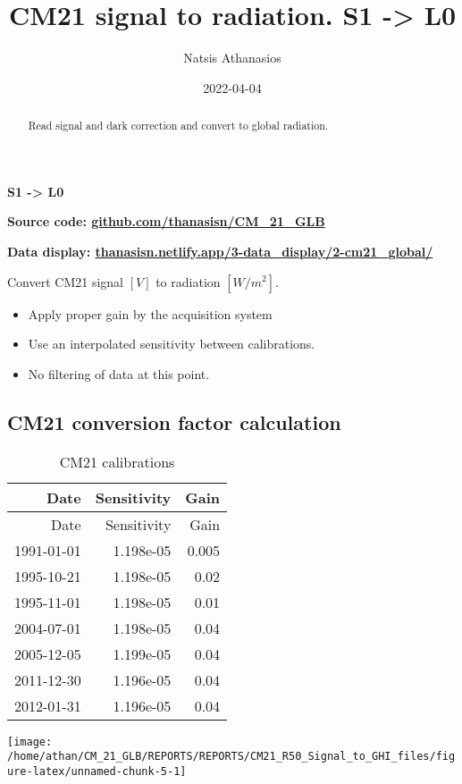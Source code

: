 \documentclass[
  11pt,
  a4paper,oneside]{article}
\title{CM21 signal to radiation. \textbf{S1 -\textgreater{} L0}}
\author{Natsis Athanasios}
\date{2022-04-04}
\providecommand{\tightlist}{%
  \setlength{\itemsep}{0pt}\setlength{\parskip}{0pt}}
\begin{document}
\maketitle
\begin{abstract}
Read signal and dark correction and convert to global radiation.
\end{abstract}

{
\hypersetup{linkcolor=}
\setcounter{tocdepth}{2}
\tableofcontents
}
\textbf{S1 -\textgreater{} L0}

\textbf{Source code: \href{https://github.com/thanasisn/CM_21_GLB}{github.com/thanasisn/CM\_21\_GLB}}

\textbf{Data display: \href{https://thanasisn.netlify.app/3-data_display/2-cm21_global/}{thanasisn.netlify.app/3-data\_display/2-cm21\_global/}}

Convert CM21 signal \([V]\) to radiation \([W/m^2]\).

\begin{itemize}
\tightlist
\item
  Apply proper gain by the acquisition system
\item
  Use an interpolated sensitivity between calibrations.
\item
  No filtering of data at this point.
\end{itemize}

\hypertarget{cm21-conversion-factor-calculation}{%
\subsection{CM21 conversion factor calculation}\label{cm21-conversion-factor-calculation}}

\begin{longtable}[]{@{}rrr@{}}
\caption{CM21 calibrations}\tabularnewline
\toprule
Date & Sensitivity & Gain\tabularnewline
\midrule
\endfirsthead
\toprule
Date & Sensitivity & Gain\tabularnewline
\midrule
\endhead
1991-01-01 & 1.198e-05 & 0.005\tabularnewline
1995-10-21 & 1.198e-05 & 0.02\tabularnewline
1995-11-01 & 1.198e-05 & 0.01\tabularnewline
2004-07-01 & 1.198e-05 & 0.04\tabularnewline
2005-12-05 & 1.199e-05 & 0.04\tabularnewline
2011-12-30 & 1.196e-05 & 0.04\tabularnewline
2012-01-31 & 1.196e-05 & 0.04\tabularnewline
\bottomrule
\end{longtable}

\begin{center}\texttt{[image: /home/athan/CM\_21\_GLB/REPORTS/REPORTS/CM21\_R50\_Signal\_to\_GHI\_files/figure-latex/unnamed-chunk-5-1]} \end{center}
\end{document}
